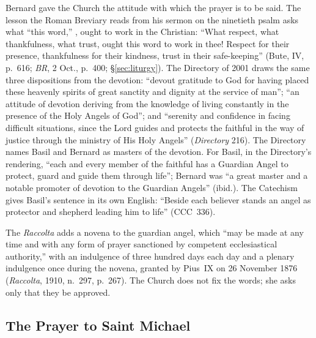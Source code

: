 Bernard gave the Church the attitude with which the prayer is to be said.
The lesson the Roman Breviary reads from his sermon on the ninetieth psalm
asks what ``this word,'' , ought to
work in the Christian: ``What respect, what thankfulness, what trust,
ought this word to work in thee! Respect for their presence, thankfulness
for their kindness, trust in their safe-keeping'' (Bute, IV, p.~616;
\emph{BR}, 2 Oct., p.~400; \S\ref{sec:liturgy}). The Directory of
2001 draws the same three dispositions from the devotion: ``devout
gratitude to God for having placed these heavenly spirits of great
sanctity and dignity at the service of man''; ``an attitude of devotion
deriving from the knowledge of living constantly in the presence of the
Holy Angels of God''; and ``serenity and confidence in facing difficult
situations, since the Lord guides and protects the faithful in the way of
justice through the ministry of His Holy Angels'' (\emph{Directory} 216).
The Directory names Basil and Bernard as masters of the devotion. For
Basil, in the Directory's rendering, ``each and every member of the
faithful has a Guardian Angel to protect, guard and guide them through
life''; Bernard was ``a great master and a notable promoter of devotion to
the Guardian Angels'' (ibid.). The Catechism gives Basil's sentence in
its own English: ``Beside each believer stands an angel as protector and
shepherd leading him to life'' (CCC~336).

The \emph{Raccolta} adds a novena to the guardian angel, which ``may be
made at any time and with any form of prayer sanctioned by competent
ecclesiastical authority,'' with an indulgence of three hundred days each
day and a plenary indulgence once during the novena, granted by Pius~IX
on 26 November 1876 (\emph{Raccolta}, 1910, n.~297, p.~267). The Church
does not fix the words; she asks only that they be approved.

\sectionguard
\subsection{The Prayer to Saint Michael}

